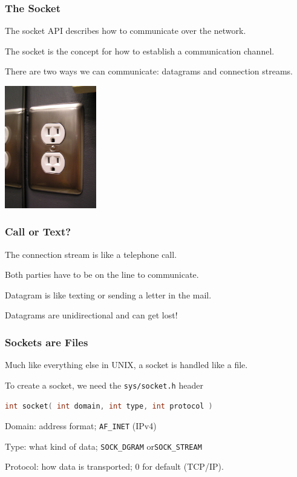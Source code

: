 \begin{frame}
\frametitle{The Socket}

The \alert{socket} API describes how to communicate over the network. 

The socket is the concept for how to establish a communication channel.

 There are two ways we can communicate: datagrams and connection streams.

\begin{center}
	\includegraphics[width=0.3\textwidth]{images/electrical-outlet.jpg}
\end{center}

\end{frame}


\begin{frame}
\frametitle{Call or Text?}

The connection stream is like a telephone call. 

Both parties have to be on the line to communicate. 

Datagram is like texting or sending a letter in the mail.

Datagrams are unidirectional and can get lost!


\end{frame}

\begin{frame}[fragile]
\frametitle{Sockets are Files}

Much like everything else in UNIX, a socket is handled like a file. 

To create a socket, we need the \texttt{sys/socket.h} header

\begin{lstlisting}[language=C]
int socket( int domain, int type, int protocol )
\end{lstlisting}

Domain: address format; \texttt{AF\_INET} (IPv4)

Type: what kind of data; \texttt{SOCK\_DGRAM} or\texttt {SOCK\_STREAM}

Protocol: how data is transported; 0 for default (TCP/IP).

\end{frame}


